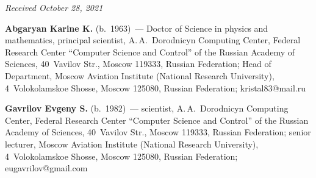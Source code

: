 \vspace*{-6pt}

\hfill{\small\textit{Received October 28, 2021}}


\vspace*{-18pt}

  \Contr
  
  \vspace*{-3pt}
  
  \noindent
  \textbf{Abgaryan Karine K.} (b.\ 1963)~--- Doctor of Science in physics and mathematics, principal 
scientist, A.\,A.~Dorodnicyn Computing Center, Federal Research Center ``Computer Science and 
Control'' of the Russian Academy of Sciences, 40~Vavilov Str., Moscow 119333, Russian Federation; 
Head of Department, Moscow Aviation Institute (National Research University), 4~Volokolamskoe 
Shosse, Moscow 125080, Russian Federation; \mbox{kristal83@mail.ru}
   
   \vspace*{3pt}
   
   \noindent
   \textbf{Gavrilov Evgeny S.} (b.\ 1982)~--- scientist, 
A.\,A.~Dorodnicyn Computing Center, Federal Research Center ``Computer Science and Control'' of the 
Russian Academy of Sciences, 40~Vavilov Str., Moscow 119333, Russian Federation; senior lecturer, 
Moscow Aviation Institute (National Research University), 4~Volokolamskoe Shosse, Moscow 125080, 
Russian Federation; \mbox{eugavrilov@gmail.com}
  
 


\label{end\stat}

\renewcommand{\bibname}{\protect\rm Литература} 